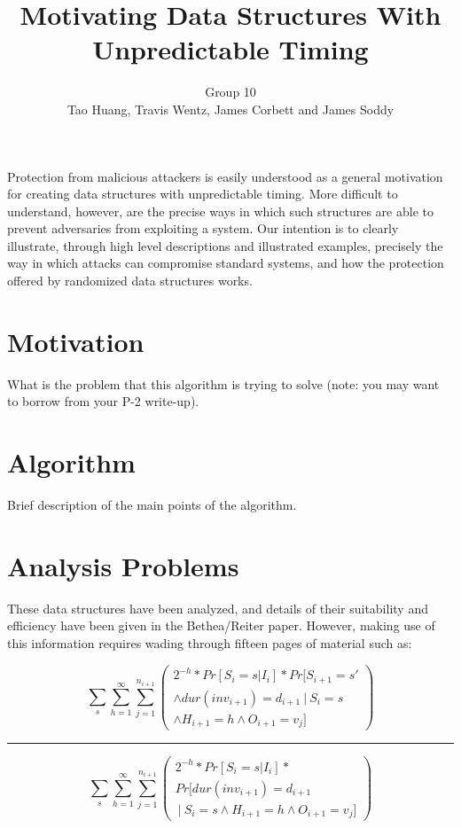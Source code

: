 \documentclass[11pt,twocolumn]{article}
\title{Motivating Data Structures With Unpredictable Timing}
\author{Group 10\\
\small{Tao Huang, Travis Wentz, James Corbett and James Soddy}}
\begin{document}
\maketitle

Protection from malicious attackers is easily understood as a general motivation
for creating data structures with unpredictable timing. More difficult to understand,
however, are the precise ways in which such structures are able to prevent adversaries
from exploiting a system. Our intention is to clearly illustrate, through
high level descriptions and illustrated examples, precisely the way in which attacks
can compromise standard systems, and how the protection offered by randomized
data structures works.

\section{Motivation}
What is the problem that this algorithm is trying to solve (note: you may want 
to borrow from your P-2 write-up).

\section{Algorithm}
Brief description of the main points of the algorithm.

\section{Analysis Problems}
These data structures have been analyzed, and details of their suitability and
efficiency have been given in the Bethea/Reiter paper\cite{Bethea09}. However,
making use of this information requires wading through fifteen pages of material such as:

\begin{minipage}{.5\textwidth}

$$\sum_s\sum_{h=1}^\infty\sum_{j=1}^{n_{i+1}} \left( \begin{matrix}
2^{-h}*Pr[S_i=s | I_i]*Pr[S_{i+1}=s' \\ \land dur(inv_{i+1})=d_{i+1}\  
|\  S_i=s \\ \land H_{i+1}=h \land O_{i+1}=v_j] \end{matrix} \right)$$
\hrule
$$\sum_s\sum_{h=1}^\infty\sum_{j=1}^{n_{i+1}} 
\left( \begin{matrix}2^{-h}*Pr[S_i=s | I_i]*
\\Pr[ dur(inv_{i+1})=d_{i+1} \\ \  | \  S_i=s \land H_{i+1}=h \land O_{i+1}=v_j] \end{matrix} \right)$$

\end{minipage}
\end{document}
